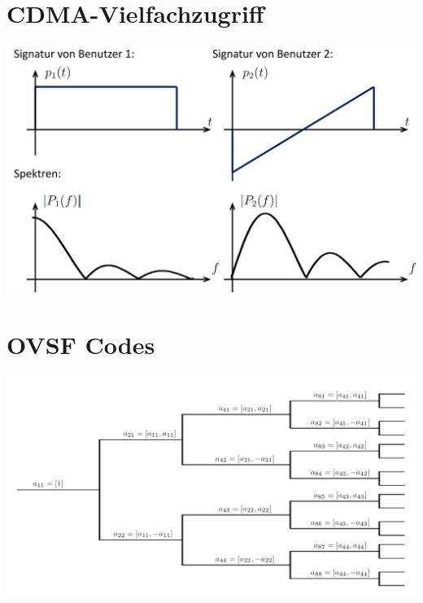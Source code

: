 \section{CDMA-Vielfachzugriff}
\begin{center}
	\includegraphics[width=.9\textwidth]{../fig/cdma.png}
\end{center}

\section{OVSF Codes}
\begin{center}
	\includegraphics[width=.9\textwidth]{../fig/ovsf.png}
\end{center}
